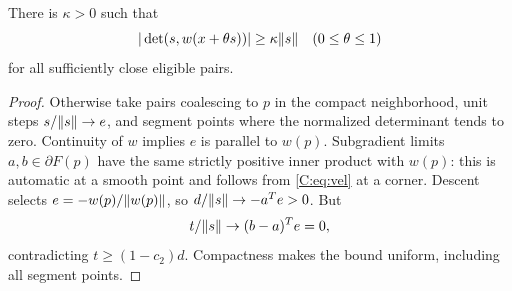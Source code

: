 \begin{lemma}\label{C:lem:trans}
There is $\kappa>0$ such that
\[
 |\det(s,w(x+\theta s))|\ge\kappa\lVert s\rVert
 \quad(0\le\theta\le1)
\]
for all sufficiently close eligible pairs.
\end{lemma}
\begin{proof}
Otherwise take pairs coalescing to $p$ in the compact neighborhood, unit steps $s/\lVert s\rVert\to e$, and segment points where the normalized determinant tends to zero. Continuity of $w$ implies $e$ is parallel to $w(p)$. Subgradient limits $a,b\in\partial F(p)$ have the same strictly positive inner product with $w(p)$: this is automatic at a smooth point and follows from \eqref{C:eq:vel} at a corner. Descent selects $e=-w(p)/\lVert w(p)\rVert$, so $d/\lVert s\rVert\to-a^Te>0$. But
\[
 t/\lVert s\rVert\to(b-a)^Te=0,
\]
contradicting $t\ge(1-c_2)d$. Compactness makes the bound uniform, including all segment points.
\end{proof}

